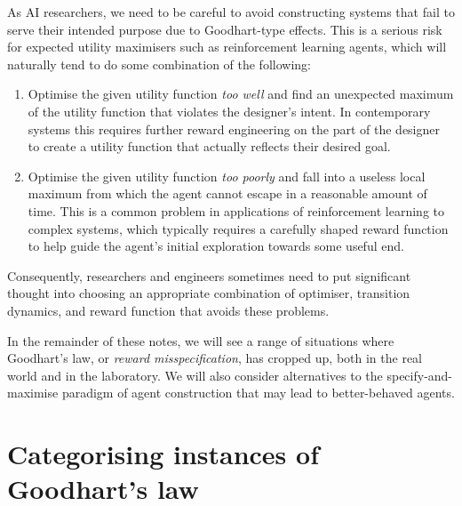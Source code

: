 \documentclass[11pt]{article}
\begin{document}
As AI researchers, we need to be careful to avoid constructing systems that fail
to serve their intended purpose due to Goodhart-type effects.
%
This is a serious risk for expected utility maximisers such as reinforcement
learning agents, which will naturally tend to do some combination of the
following:
%
\begin{enumerate}
  \item Optimise the given utility function \textit{too well} and find
    an unexpected maximum of the utility function that violates the designer's
    intent.
    In contemporary systems this requires further reward engineering on the part
    of the designer to create a utility function that actually reflects their
    desired goal.

  \item Optimise the given utility function \textit{too poorly} and fall into
    a useless local maximum from which the agent cannot escape in a reasonable
    amount of time.
    This is a common problem in applications of reinforcement learning to
    complex systems, which typically requires a carefully shaped reward function
    to help guide the agent's initial exploration towards some useful end.
\end{enumerate}
%
Consequently, researchers and engineers sometimes need to put significant
thought into choosing an appropriate combination of optimiser, transition
dynamics, and reward function that avoids these problems.

In the remainder of these notes, we will see a range of situations where
Goodhart's law, or \textit{reward misspecification}, has cropped up, both in the
real world and in the laboratory.
%
We will also consider alternatives to the specify-and-maximise paradigm of agent
construction that may lead to better-behaved agents.

\section{Categorising instances of Goodhart's law}
\end{document}
